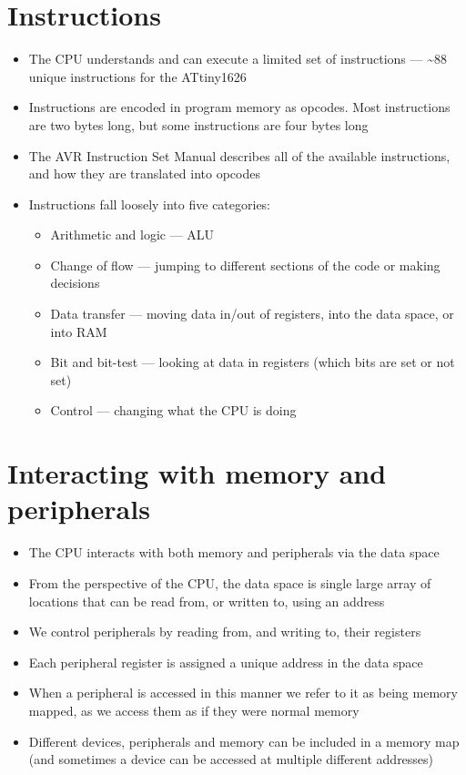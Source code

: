 \documentclass{report}
\begin{document}
\section{Instructions}
\begin{itemize}
    \item The CPU understands and can execute a limited set of instructions --- \textasciitilde88 unique instructions for the ATtiny1626
    \item Instructions are encoded in program memory as opcodes. Most instructions are two bytes long, but some instructions are four bytes long
    \item The AVR Instruction Set Manual describes all of the available instructions, and how they are translated into opcodes
    \item Instructions fall loosely into five categories:
          \begin{itemize}
              \item Arithmetic and logic --- ALU
              \item Change of flow --- jumping to different sections of the code or making decisions
              \item Data transfer --- moving data in/out of registers, into the data space, or into RAM
              \item Bit and bit-test --- looking at data in registers (which bits are set or not set)
              \item Control --- changing what the CPU is doing
          \end{itemize}
\end{itemize}
\section{Interacting with memory and peripherals}
\begin{itemize}
    \item The CPU interacts with both memory and peripherals via the data space
    \item From the perspective of the CPU, the data space is single large array of
          locations that can be read from, or written to, using an address
    \item We control peripherals by reading from, and writing to, their registers
    \item Each peripheral register is assigned a unique address in the data space
    \item When a peripheral is accessed in this manner we refer to it as being
          memory mapped, as we access them as if they were normal memory
    \item Different devices, peripherals and memory can be included in a memory map
          (and sometimes a device can be accessed at multiple different addresses)
\end{itemize}
\end{document}
